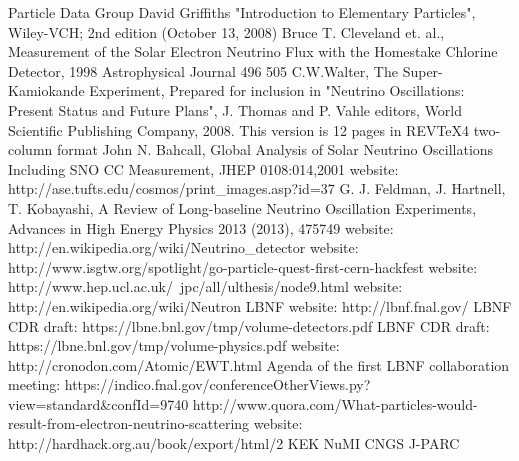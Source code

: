\begin{thebibliography}{1}
    Particle Data Group
    David Griffiths "Introduction to Elementary Particles", Wiley-VCH; 2nd edition (October 13, 2008)
    Bruce T. Cleveland et. al., Measurement of the Solar Electron Neutrino Flux with the Homestake Chlorine Detector, 1998 Astrophysical Journal 496 505
    C.W.Walter, The Super-Kamiokande Experiment, Prepared for inclusion in "Neutrino Oscillations: Present Status and Future Plans", J. Thomas and P. Vahle editors, World Scientific Publishing Company, 2008. This version is 12 pages in REVTeX4 two-column format
    John N. Bahcall, Global Analysis of Solar Neutrino Oscillations Including SNO CC Measurement, JHEP 0108:014,2001
    website: http://ase.tufts.edu/cosmos/print\_images.asp?id=37
    G. J. Feldman, J. Hartnell, T. Kobayashi, A Review of Long-baseline Neutrino Oscillation Experiments, Advances in High Energy Physics 2013 (2013), 475749
    website: http://en.wikipedia.org/wiki/Neutrino\_detector
    website: http://www.isgtw.org/spotlight/go-particle-quest-first-cern-hackfest
    website: http://www.hep.ucl.ac.uk/~jpc/all/ulthesis/node9.html
    website: http://en.wikipedia.org/wiki/Neutron
    LBNF website: http://lbnf.fnal.gov/
    LBNF CDR draft: https://lbne.bnl.gov/tmp/volume-detectors.pdf
    LBNF CDR draft: https://lbne.bnl.gov/tmp/volume-physics.pdf
    website: http://cronodon.com/Atomic/EWT.html
    Agenda of the first LBNF collaboration meeting: https://indico.fnal.gov/conferenceOtherViews.py?view=standard\&confId=9740
   http://www.quora.com/What-particles-would-result-from-electron-neutrino-scattering
    website: http://hardhack.org.au/book/export/html/2
    KEK
    NuMI
    CNGS
    J-PARC
\end{thebibliography}
